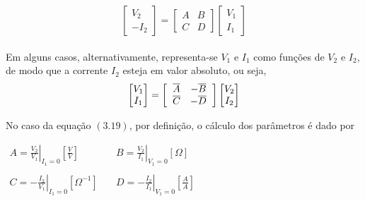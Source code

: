 \documentclass{article}
\numberwithin{equation}{section}
\begin{document}
    \begin{equation}
        \begin{bmatrix}
            V_{2} \\
            -I_{2}
        \end{bmatrix}
        = %
        \begin{bmatrix}
            A & B \\
            C & D
        \end{bmatrix}
        \begin{bmatrix}
            V_{1} \\
            I_{1}
        \end{bmatrix}
    \end{equation}
    \\
    Em alguns casos, alternativamente, representa-se $V_{1}$ e $I_{1}$ como funções de $V_{2}$ e $I_{2}$, de modo que a corrente $I_{2}$ esteja em valor absoluto, ou seja,
    \begin{equation*}
        \begin{bmatrix}
            V_{1} \\
            I_{1}
        \end{bmatrix}
        = %
        \begin{bmatrix}
            \hspace{0.2cm} \overline{A} & -\overline{B} \hspace{0.2cm} \\
            \hspace{0.2cm} \overline{C} & -\overline{D} \hspace{0.2cm}
        \end{bmatrix}
        \begin{bmatrix}
            V_{2} \\
            I_{2}
        \end{bmatrix}
    \end{equation*}

    No caso da equação $(3.19)$, por definição, o cálculo dos parâmetros é dado por
    \begin{center}
        $\begin{matrix} %
                A=\displaystyle\left.\frac{V_{2}}{V_{1}}\right|_{I_{1}=0} \left[\frac{V}{V}\right] &\quad B=\displaystyle\left.\frac{V_{2}}{I_{1}}\right|_{V_{1}=0}[\Omega]\\\\
                C=\displaystyle\left.-\frac{I_{2}}{V_{1}}\right|_{I_{1}=0}[\Omega^{-1}]&\quad
                D=\displaystyle\left.-\frac{I_{2}}{I_{1}}\right|_{V_{1}=0}\left[\frac{A}{A}\right]
        \end{matrix}$
    \end{center}
\end{document}
